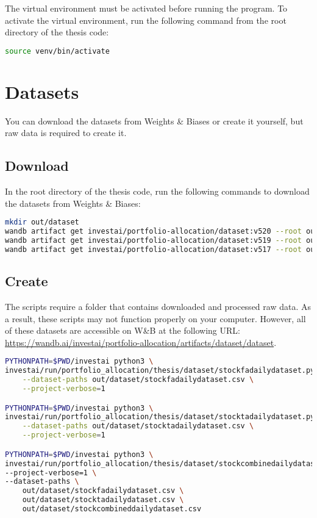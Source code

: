 \documentclass[../xlapes02]{subfiles}
\begin{document}
    The virtual environment must be activated before running the program. To activate the virtual environment, run the following command from the root directory of the thesis code:
    \begin{lstlisting}[language=bash]
source venv/bin/activate
    \end{lstlisting}


    \section{Datasets}
    You can download the datasets from Weights \& Biases or create it yourself, but raw data is required to create it.

    \subsection{Download}
    In the root directory of the thesis code, run the following commands to download the datasets from Weights \& Biases:
    \begin{lstlisting}[language=bash]
mkdir out/dataset
wandb artifact get investai/portfolio-allocation/dataset:v520 --root out/dataset
wandb artifact get investai/portfolio-allocation/dataset:v519 --root out/dataset
wandb artifact get investai/portfolio-allocation/dataset:v517 --root out/dataset
    \end{lstlisting}

    \subsection{Create}
    The scripts require a folder that contains downloaded and processed raw data. As a result, these scripts may not function properly on your computer. However, all of these datasets are accessible on W\&B at the following URL: \url{https://wandb.ai/investai/portfolio-allocation/artifacts/dataset/dataset}.
    \begin{lstlisting}[language=bash]
PYTHONPATH=$PWD/investai python3 \
investai/run/portfolio_allocation/thesis/dataset/stockfadailydataset.py \
    --dataset-paths out/dataset/stockfadailydataset.csv \
    --project-verbose=1

PYTHONPATH=$PWD/investai python3 \
investai/run/portfolio_allocation/thesis/dataset/stocktadailydataset.py \
    --dataset-paths out/dataset/stocktadailydataset.csv \
    --project-verbose=1

PYTHONPATH=$PWD/investai python3 \
investai/run/portfolio_allocation/thesis/dataset/stockcombinedailydataset.py \
--project-verbose=1 \
--dataset-paths \
    out/dataset/stockfadailydataset.csv \
    out/dataset/stocktadailydataset.csv \
    out/dataset/stockcombineddailydataset.csv
    \end{lstlisting}
\end{document}
